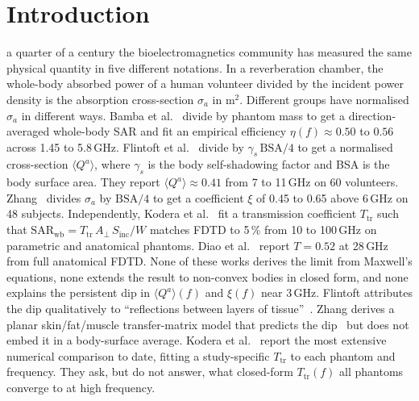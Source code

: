 \documentclass[journal,twocolumn,10pt]{IEEEtran}
\theoremstyle{plain}
\theoremstyle{remark}
\newcommand{\Sinc}{S_{\mathrm{inc}}}
\begin{document}
\IEEEpeerreviewmaketitle


\section{Introduction}\label{sec:intro}
 a quarter of a century the bioelectromagnetics
community has measured the same physical quantity in five different
notations. In a reverberation chamber, the whole-body absorbed power
of a human volunteer divided by the incident power density is the
absorption cross-section $\sigma_a$ in m$^2$. Different groups have
normalised $\sigma_a$ in different ways. Bamba
et al.~\cite{Bamba2014} divide by phantom mass to get a
direction-averaged whole-body SAR and fit an empirical efficiency
$\eta(f) \approx 0.50$ to $0.56$ across 1.45 to 5.8\,GHz. Flintoft
et al.~\cite{Flintoft2014} divide by $\gamma_s\,\mathrm{BSA}/4$ to
get a normalised cross-section $\langle Q^a\rangle$, where
$\gamma_s$ is the body self-shadowing factor and BSA is the body
surface area. They report $\langle Q^a\rangle \approx 0.41$ from 7 to
11\,GHz on 60 volunteers. Zhang~\cite{Zhang2017thesis,
ZhangRobinson2020} divides $\sigma_a$ by $\mathrm{BSA}/4$ to get a
coefficient $\xi$ of 0.45 to 0.65 above 6\,GHz on 48 subjects.
Independently, Kodera et al.~\cite{Kodera2024} fit a
transmission coefficient $T_{\mathrm{tr}}$ such that
$\mathrm{SAR}_{\mathrm{wb}} = T_{\mathrm{tr}}\,A_\perp\,\Sinc/W$
matches FDTD to 5\,\% from 10 to 100\,GHz on parametric and anatomical
phantoms. Diao et al.~\cite{Diao2024} report $T = 0.52$ at
28\,GHz from full anatomical FDTD. None of these works derives the
limit from Maxwell's equations, none extends the result to non-convex
bodies in closed form, and none explains the persistent dip in
$\langle Q^a\rangle(f)$ and $\xi(f)$ near 3\,GHz. Flintoft attributes
the dip qualitatively to ``reflections between layers of
tissue''~\cite[p.~3306]{Flintoft2014}. Zhang derives a planar
skin/fat/muscle transfer-matrix model that predicts the
dip~\cite[Sec.~2.2]{Zhang2017thesis} but does not embed it in a
body-surface average. Kodera et al.~\cite{Kodera2024} report the
most extensive numerical comparison to date, fitting a study-specific
$T_{\mathrm{tr}}$ to each phantom and frequency. They ask, but do not
answer, what closed-form $T_{\mathrm{tr}}(f)$ all phantoms converge
to at high frequency.
\end{document}
